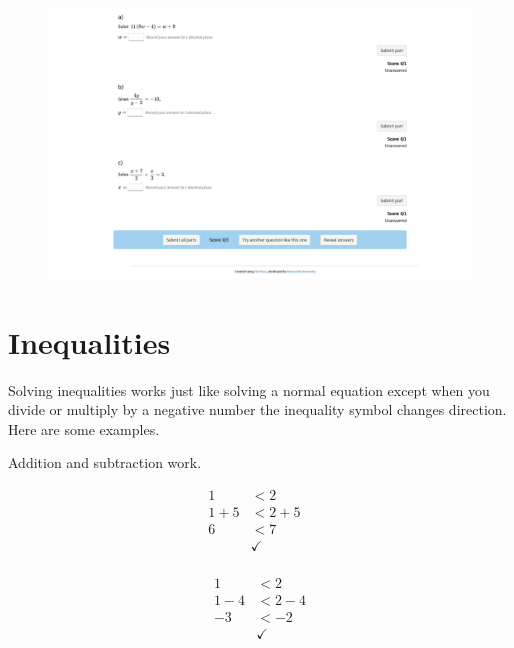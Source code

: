 \documentclass[
  a4paper,
]{scrbook}
\begin{document}
\begin{figure}

{\centering 

\href{https://numbas.mathcentre.ac.uk/question/104234/equations-linear-equations-2-unknowns-on-both-sides/embed/?token=c65c1027-db21-4273-bc3c-7e1a348e8510}{\includegraphics{./05-solving_equations_files/figure-pdf/unnamed-chunk-2-1.png}}

}

\end{figure}

\hypertarget{inequalities}{%
\section{Inequalities}\label{inequalities}}

Solving inequalities works just like solving a normal equation except
when you divide or multiply by a negative number the inequality symbol
changes direction. Here are some examples.

Addition and subtraction work.

\[
\begin{aligned} 1 &< 2 \\
1 + 5 &< 2 + 5\\
6 &< 7\\
&\checkmark&\\
\end{aligned}
\]

\[
\begin{aligned} 1 &< 2 \\
1 -4 &< 2 -4\\
-3 &< -2\\
&\checkmark
\end{aligned}
\]
\end{document}

